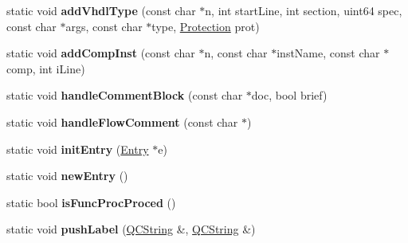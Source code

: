 \begin{DoxyCompactItemize}
\item 
\mbox{\label{classvhdl_1_1parser_1_1_vhdl_parser_aba39936f741bf015f084aa5b94c3e533}} 
static void {\bfseries add\+Vhdl\+Type} (const char $\ast$n, int start\+Line, int section, uint64 spec, const char $\ast$args, const char $\ast$type, \mbox{\hyperlink{types_8h_a90e352184df58cd09455fe9996cd4ded}{Protection}} prot)
\item 
\mbox{\label{classvhdl_1_1parser_1_1_vhdl_parser_a4c263a0001d3299809648502eadbd2a9}} 
static void {\bfseries add\+Comp\+Inst} (const char $\ast$n, const char $\ast$inst\+Name, const char $\ast$comp, int i\+Line)
\item 
\mbox{\label{classvhdl_1_1parser_1_1_vhdl_parser_a9a0e7180618e2c82d66e54c1343eb8fb}} 
static void {\bfseries handle\+Comment\+Block} (const char $\ast$doc, bool brief)
\item 
\mbox{\label{classvhdl_1_1parser_1_1_vhdl_parser_aa61b79076241620460a6333349cf6aac}} 
static void {\bfseries handle\+Flow\+Comment} (const char $\ast$)
\item 
\mbox{\label{classvhdl_1_1parser_1_1_vhdl_parser_ae19da4fb0229482624a2b01740c4f622}} 
static void {\bfseries init\+Entry} (\mbox{\hyperlink{class_entry}{Entry}} $\ast$e)
\item 
\mbox{\label{classvhdl_1_1parser_1_1_vhdl_parser_a984fed01b28f3d04bd83a082d7449b31}} 
static void {\bfseries new\+Entry} ()
\item 
\mbox{\label{classvhdl_1_1parser_1_1_vhdl_parser_a4a8fbc9da0bd2a85d9202beec2d70e39}} 
static bool {\bfseries is\+Func\+Proc\+Proced} ()
\item 
\mbox{\label{classvhdl_1_1parser_1_1_vhdl_parser_ac92b32a2fa197338035536cd6a16ff8b}} 
static void {\bfseries push\+Label} (\mbox{\hyperlink{class_q_c_string}{Q\+C\+String}} \&, \mbox{\hyperlink{class_q_c_string}{Q\+C\+String}} \&)
\item 
\mbox{\label{classvhdl_1_1parser_1_1_vhdl_parser_a733f1db25d6dede6d00de1230e95bd21}} 

\end{DoxyCompactItemize}
